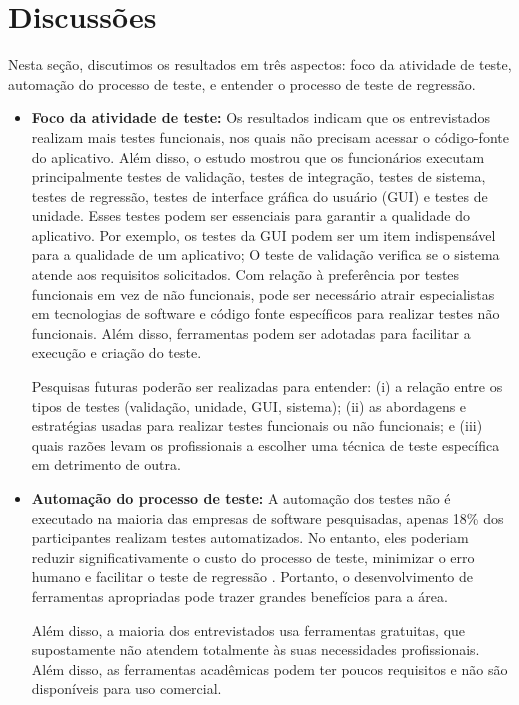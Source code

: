 \section{Discussões}\label{discussions}

Nesta seção, discutimos os resultados em três aspectos: foco da atividade de teste, automação do processo de teste, e entender o processo de teste de regressão.

\begin{itemize}
\item \textbf{Foco da atividade de teste:} Os resultados indicam que os entrevistados realizam mais testes funcionais, nos quais não precisam acessar o código-fonte do aplicativo. Além disso, o estudo mostrou que os funcionários executam principalmente testes de validação, testes de integração, testes de sistema, testes de regressão, testes de interface gráfica do usuário (GUI) e testes de unidade. Esses testes podem ser essenciais para garantir a qualidade do aplicativo. Por exemplo, os testes da GUI podem ser um item indispensável para a qualidade de um aplicativo; O teste de validação verifica se o sistema atende aos requisitos solicitados. Com relação à preferência por testes funcionais em vez de não funcionais, pode ser necessário atrair especialistas em tecnologias de software e código fonte específicos para realizar testes não funcionais. Além disso, ferramentas podem ser adotadas para facilitar a execução e criação do teste.

Pesquisas futuras poderão ser realizadas para entender: (i) a relação entre os tipos de testes (validação, unidade, GUI, sistema); (ii) as abordagens e estratégias usadas para realizar testes funcionais ou não funcionais; e (iii) quais razões levam os profissionais a escolher uma técnica de teste específica em detrimento de outra.
    
\item \textbf{Automação do processo de teste:} A automação dos testes não é executado na maioria das empresas de software pesquisadas, apenas 18\% dos participantes realizam testes automatizados. No entanto, eles poderiam reduzir significativamente o custo do processo de teste, minimizar o erro humano e facilitar o teste de regressão \cite{Ammann:2008:IST:1355340}. Portanto, o desenvolvimento de ferramentas apropriadas pode trazer grandes benefícios para a área.

Além disso, a maioria dos entrevistados usa ferramentas gratuitas, que supostamente não atendem totalmente às suas necessidades profissionais. Além disso, as ferramentas acadêmicas podem ter poucos requisitos e não são disponíveis para uso comercial.


\end{itemize}
